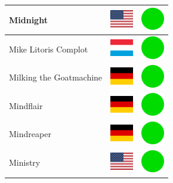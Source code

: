 \documentclass[12pt, a4paper, twoside]{report}
\begin{document}
\begin{center}
\begin{longtable}{|p{5cm}|p{2cm}|p{2cm}|}
 Midnight                                                   & \includegraphics[width=1cm]{../4x3/us} &   \includegraphics[width=1cm]{../likes/y} \\ \hline
 Mike Litoris Complot                                       & \includegraphics[width=1cm]{../4x3/lu} &   \includegraphics[width=1cm]{../likes/y} \\ \hline
 Milking the Goatmachine                                    & \includegraphics[width=1cm]{../4x3/de} &   \includegraphics[width=1cm]{../likes/y} \\ \hline
 Mindflair                                                  & \includegraphics[width=1cm]{../4x3/de} &   \includegraphics[width=1cm]{../likes/y} \\ \hline
 Mindreaper                                                 & \includegraphics[width=1cm]{../4x3/de} &   \includegraphics[width=1cm]{../likes/y} \\ \hline
 Ministry                                                   & \includegraphics[width=1cm]{../4x3/us} &   \includegraphics[width=1cm]{../likes/y} \\ \hline

\end{longtable}
\end{center}
\end{document}
